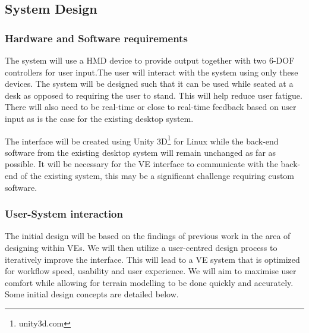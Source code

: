 \documentclass{sig-alternate-05-2015}
\begin{document}
\subsection{System Design}
\subsubsection{Hardware and Software requirements}
The system will use a HMD device to provide output together with two 6-DOF controllers for user input.The user will interact with the system using only these devices. The system will be designed such that it can be used while seated at a desk as opposed to requiring the user to stand. This will help reduce user fatigue\cite{Schultheis2012}. There will also need to be real-time or close to real-time feedback based on user input as is the case for the existing desktop system.

The interface will be created using Unity 3D\footnote{unity3d.com} for Linux while the back-end software from the existing desktop system will remain unchanged as far as possible. It will be necessary for the VE interface to communicate with the back-end of the existing system, this may be a significant challenge requiring custom software.

\subsubsection{User-System interaction}
The initial design will be based on the findings of previous work in the area of designing within VEs. We will then utilize a user-centred design process to iteratively improve the interface. This will lead to a VE system that is optimized for workflow speed, usability and user experience. We will aim to maximise user comfort while allowing for terrain modelling to be done quickly and accurately. Some initial design concepts are detailed below.

\end{document}
